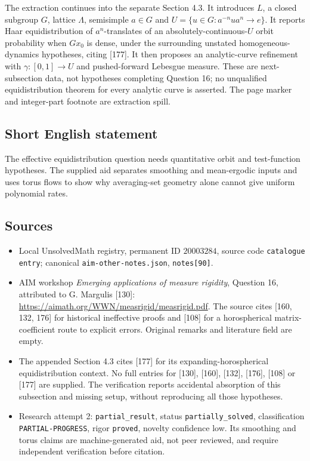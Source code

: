 \documentclass[11pt]{article}
\begin{document}
The extraction continues into the separate Section 4.3. It introduces $L$, a closed subgroup $G$, lattice $\Lambda$, semisimple $a\in G$ and $U=\{u\in G:a^{-n}ua^n\to e\}$. It reports Haar equidistribution of $a^n$-translates of an absolutely-continuous-$U$ orbit probability when $Gx_0$ is dense, under the surrounding unstated homogeneous-dynamics hypotheses, citing [177]. It then proposes an analytic-curve refinement with $\gamma:[0,1]\to U$ and pushed-forward Lebesgue measure. These are next-subsection data, not hypotheses completing Question 16; no unqualified equidistribution theorem for every analytic curve is asserted. The page marker and integer-part footnote are extraction spill.
\subsection{Short English statement}
The effective equidistribution question needs quantitative orbit and test-function hypotheses. The supplied aid separates smoothing and mean-ergodic inputs and uses torus flows to show why averaging-set geometry alone cannot give uniform polynomial rates.
\subsection{Sources}
\begin{itemize}
\item Local UnsolvedMath registry, permanent ID $20003284$, source code \texttt{catalogue entry}; canonical \texttt{aim-other-notes.json}, \texttt{notes[90]}.
\item AIM workshop \emph{Emerging applications of measure rigidity}, Question 16, attributed to G. Margulis [130]: \url{https://aimath.org/WWN/measrigid/measrigid.pdf}. The source cites [160, 132, 176] for historical ineffective proofs and [108] for a horospherical matrix-coefficient route to explicit errors. Original remarks and literature field are empty.
\item The appended Section 4.3 cites [177] for its expanding-horospherical equidistribution context. No full entries for [130], [160], [132], [176], [108] or [177] are supplied. The verification reports accidental absorption of this subsection and missing setup, without reproducing all those hypotheses.
\item Research attempt 2: \texttt{partial\_result}, status \texttt{partially\_solved}, classification \texttt{PARTIAL-PROGRESS}, rigor \texttt{proved}, novelty confidence low. Its smoothing and torus claims are machine-generated aid, not peer reviewed, and require independent verification before citation.
\end{itemize}
\end{document}
